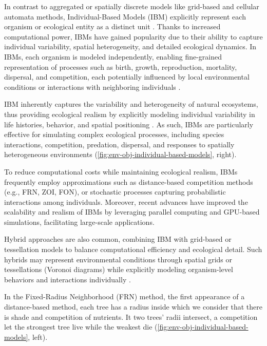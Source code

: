 In contrast to aggregated or spatially discrete models like grid-based and cellular automata methods, Individual-Based Models (IBM) explicitly represent each organism or ecological entity as a distinct unit \cite{Crooks2017}. Thanks to increased computational power, IBMs have gained popularity due to their ability to capture individual variability, spatial heterogeneity, and detailed ecological dynamics. In IBMs, each organism is modeled independently, enabling fine-grained representation of processes such as birth, growth, reproduction, mortality, dispersal, and competition, each potentially influenced by local environmental conditions or interactions with neighboring individuals \cite{Chng2013,Peytavie2024a}.

IBM inherently captures the variability and heterogeneity of natural ecosystems, thus providing ecological realism by explicitly modeling individual variability in life histories, behavior, and spatial positioning \cite{McLane2011,Zhang2020}. As such, IBMs are particularly effective for simulating complex ecological processes, including species interactions, competition, predation, dispersal, and responses to spatially heterogeneous environments  (\cref{fig:env-obj-individual-based-models}, right).

To reduce computational costs while maintaining ecological realism, IBMs frequently employ approximations such as distance-based competition methods (e.g., FRN, ZOI, FON), or stochastic processes capturing probabilistic interactions among individuals. Moreover, recent advances have improved the scalability and realism of IBMs by leveraging parallel computing and GPU-based simulations, facilitating large-scale applications.

Hybrid approaches are also common, combining IBM with grid-based or tessellation models to balance computational efficiency and ecological detail. Such hybrids may represent environmental conditions through spatial grids or tessellations (Voronoi diagrams) while explicitly modeling organism-level behaviors and interactions individually \cite{Chng2011a}.

In the Fixed-Radius Neighborhood (FRN) method, the first appearance of a distance-based method, each tree has a radius inside which we consider that there is shade and competition of nutrients. It two trees' radii intersect, a competition let the strongest tree live while the weakest die (\cref{fig:env-obj-individual-based-models}, left). 

